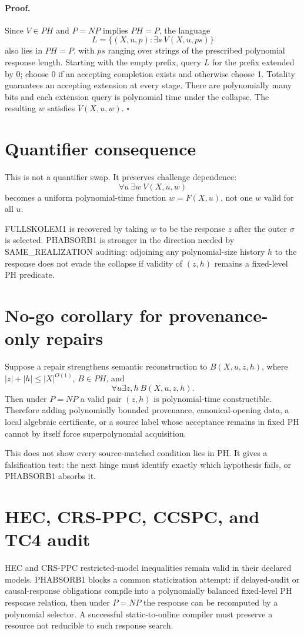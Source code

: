 \documentclass[11pt]{article}
\begin{document}
\paragraph{Proof.}
Since \(V\in PH\) and \(P=NP\) implies \(PH=P\), the language
\[
L=\{(X,u,p):\exists s\ V(X,u,ps)\}
\]
also lies in \(PH=P\), with \(ps\) ranging over strings of the prescribed polynomial response length. Starting with the empty prefix, query \(L\) for the prefix extended by 0; choose 0 if an accepting completion exists and otherwise choose 1. Totality guarantees an accepting extension at every stage. There are polynomially many bits and each extension query is polynomial time under the collapse. The resulting \(w\) satisfies \(V(X,u,w)\). \(\square\)

\section*{Quantifier consequence}
This is not a quantifier swap. It preserves challenge dependence:
\[
\forall u\ \exists w\ V(X,u,w)
\]
becomes a uniform polynomial-time function \(w=F(X,u)\), not one \(w\) valid for all \(u\).

FULLSKOLEM1 is recovered by taking \(w\) to be the response \(z\) after the outer \(\sigma\) is selected. PHABSORB1 is stronger in the direction needed by SAME\_REALIZATION auditing: adjoining any polynomial-size history \(h\) to the response does not evade the collapse if validity of \((z,h)\) remains a fixed-level PH predicate.

\section*{No-go corollary for provenance-only repairs}
Suppose a repair strengthens semantic reconstruction to \(B(X,u,z,h)\), where \(|z|+|h|\le |X|^{O(1)}\), \(B\in PH\), and
\[
\forall u\exists z,h\ B(X,u,z,h).
\]
Then under \(P=NP\) a valid pair \((z,h)\) is polynomial-time constructible. Therefore adding polynomially bounded provenance, canonical-opening data, a local algebraic certificate, or a source label whose acceptance remains in fixed PH cannot by itself force superpolynomial acquisition.

This does not show every source-matched condition lies in PH. It gives a falsification test: the next hinge must identify exactly which hypothesis fails, or PHABSORB1 absorbs it.

\section*{HEC, CRS-PPC, CCSPC, and TC4 audit}
HEC and CRS-PPC restricted-model inequalities remain valid in their declared models. PHABSORB1 blocks a common staticization attempt: if delayed-audit or causal-response obligations compile into a polynomially balanced fixed-level PH response relation, then under \(P=NP\) the response can be recomputed by a polynomial selector. A successful static-to-online compiler must preserve a resource not reducible to such response search.
\end{document}

